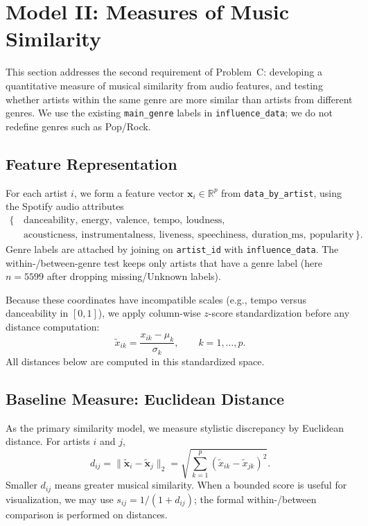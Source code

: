 \section{Model II: Measures of Music Similarity}\label{sec:model-similarity}

This section addresses the second requirement of Problem~C: developing a quantitative measure of musical similarity from audio features, and testing whether artists within the same genre are more similar than artists from different genres. We use the existing \texttt{main\_genre} labels in \texttt{influence\_data}; we do not redefine genres such as Pop/Rock.

\subsection{Feature Representation}

For each artist $i$, we form a feature vector $\mathbf{x}_i \in \mathbb{R}^{p}$ from \texttt{data\_by\_artist}, using the Spotify audio attributes
\[
\begin{aligned}
\{\,&\text{danceability},\ \text{energy},\ \text{valence},\ \text{tempo},\ \text{loudness},\\
&\text{acousticness},\ \text{instrumentalness},\ \text{liveness},\ \text{speechiness},\ \text{duration\_ms},\ \text{popularity}\,\}.
\end{aligned}
\]
Genre labels are attached by joining on \texttt{artist\_id} with \texttt{influence\_data}. The within-/between-genre test keeps only artists that have a genre label (here $n=5599$ after dropping missing/Unknown labels).

Because these coordinates have incompatible scales (e.g., tempo versus danceability in $[0,1]$), we apply column-wise $z$-score standardization before any distance computation:
\[
\tilde{x}_{ik} = \frac{x_{ik}-\mu_k}{\sigma_k},\qquad k=1,\dots,p.
\]
All distances below are computed in this standardized space.

\subsection{Baseline Measure: Euclidean Distance}

As the primary similarity model, we measure stylistic discrepancy by Euclidean distance. For artists $i$ and $j$,
\[
d_{ij} = \bigl\|\tilde{\mathbf{x}}_i - \tilde{\mathbf{x}}_j\bigr\|_2 = \sqrt{\sum_{k=1}^{p}(\tilde{x}_{ik}-\tilde{x}_{jk})^2}.
\]
Smaller $d_{ij}$ means greater musical similarity. When a bounded score is useful for visualization, we may use $s_{ij}=1/(1+d_{ij})$; the formal within-/between comparison is performed on distances.

